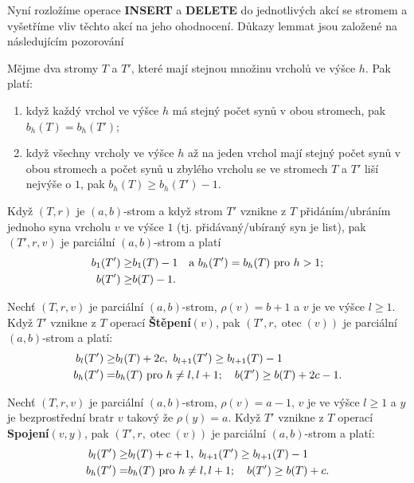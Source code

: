 \documentclass[a4paper,12pt]{article}
\DeclareMathOperator*{\otec}{otec}
\begin{document}
Nyní rozložíme operace {\bf INSERT} a {\bf DELETE} do 
jednotlivých akcí se stromem a vyšetří\-me vliv těchto 
akcí na jeho ohodnocení. Důkazy lemmat jsou 
založené na následujícím pozorování

\begin{pozorovani}Mějme dva stromy $T$ a $T'$, které mají 
stejnou množinu vrcholů ve výšce $h$. Pak platí:
\begin{enumerate}
\item
když každý vrchol ve výšce $h$ má stejný počet synů 
v obou stromech, pak $b_h(T)=b_h(T')$;
\item
když všechny vrcholy ve výšce $h$ až na jeden vrchol mají stejný 
počet synů v obou stromech a počet synů u zby\-lé\-ho vrcholu se ve stromech $
T$ a $T'$ liší nejvýše o $1$, pak $b_h(T)\ge b_h(T')-
1$.
\end{enumerate}
\end{pozorovani}

\begin{lemma_counting}Když $(T,r)$ je $(a,b)$-strom a když strom $
T'$ 
vznikne z $T$ přidáním/ubráním jednoho syna vrcholu $
v$ 
ve výšce $1$ (tj. přidávaný/ubíraný syn je list), pak 
$(T',r,v)$ je parciální $(a,b)$-strom a platí 
\begin{align*} b_1(T')\ge&b_1(T)-1\quad\text{\rm a }b_h(T')=b_h(T)\text{\rm\ pro }
h>1;\\
b(T')\ge&b(T)-1.\end{align*}
\end{lemma_counting}

\begin{lemma_counting}Nechť $(T,r,v)$ je parciální $(a,b)$-strom, 
$\rho (v)=b+1$ a $v$ je ve výšce $l\ge 1$. Když $T'$ vznikne z $
T$ 
operací {\bf Štěpení$(v)$}, pak $(T',r,\otec(v))$ je parciální 
$(a,b)$-strom a platí:  
\begin{align*} b_l(T')\ge&b_l(T)+2c,\text{\rm\ }b_{l+1}(T')\ge b_{l+1}(
T)-1\\
b_h(T')=&b_h(T)\text{\rm\ pro }h\ne l,l+1;\quad b(T')\ge b(T)+2c-
1.\end{align*}
\end{lemma_counting}

\begin{lemma_counting}Nechť $(T,r,v)$ je parciální $(a,b)$-strom, 
$\rho (v)=a-1$, $v$ je ve výšce $l\ge 1$ a $y$ je bezprostřední bratr $v$ takový že $\rho(y)=a$. Když $T'$ vznikne z $T$ operací {\bf Spojení$(v,y)$}, pak $(T',r,\otec(v))$ je parciální $(a,b)$-strom a 
platí:  
\begin{align*} b_l(T')\ge&b_l(T)+c+1,\text{\rm\ }b_{l+1}(T')\ge b_{l+1}
(T)-1\\
b_h(T')=&b_h(T)\text{\rm\ pro }h\ne l,l+1;\quad b(T')\ge b(T)+c.\end{align*}
\end{lemma_counting}
\end{document}
